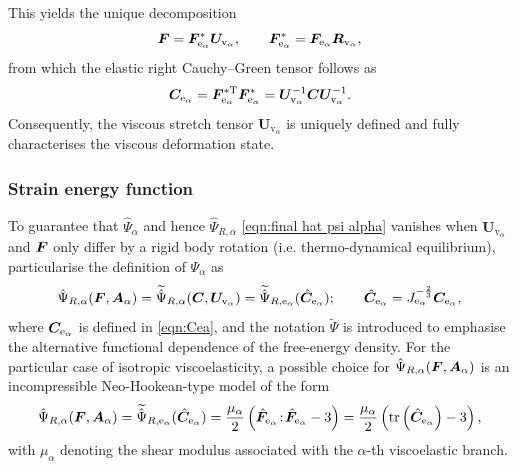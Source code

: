%
This yields the unique decomposition
%
\begin{equation}
	\label{eqb:Fv_rotation_free}
	\boldsymbol{F}
	=
	\boldsymbol{F}_{\mathrm{e}_\alpha}^{*}
	\boldsymbol{U}_{\mathrm{v}_\alpha},
	\qquad
	\boldsymbol{F}_{\mathrm{e}_\alpha}^{*}
	=
	\boldsymbol{F}_{\mathrm{e}_\alpha}
	\boldsymbol{R}_{\mathrm{v}_\alpha},
\end{equation}
%
from which the elastic right Cauchy--Green tensor follows as
%
\begin{equation}
	\label{eqn:Cea}
	\boldsymbol{C}_{\mathrm{e}_\alpha}
	=
	\boldsymbol{F}_{\mathrm{e}_\alpha}^{*\mathrm{T}}
	\boldsymbol{F}_{\mathrm{e}_\alpha}^{*}
	=
	\boldsymbol{U}_{\mathrm{v}_\alpha}^{-1}
	\boldsymbol{C}
	\boldsymbol{U}_{\mathrm{v}_\alpha}^{-1}.
\end{equation}
%
Consequently, the viscous stretch tensor $\boldsymbol{U}_{\mathrm{v}_\alpha}$ is uniquely defined and fully characterises the viscous deformation state.

\subsubsection{Strain energy function}
\label{sec:strain_energy_function}

To guarantee that $\hat{\Psi}_\alpha$ and hence $\hat{\Psi}_{R,\alpha}$ \eqref{eqn:final hat psi alpha}  vanishes when $\boldsymbol{U}_{\mathrm{v}_\alpha}$ and $\boldsymbol{F}$ only differ by a rigid body rotation (i.e. thermo-dynamical equilibrium), \cite{Liu2025} particularise the definition of $\Psi_\alpha$  as 
%
\begin{equation}
	\label{eqn:Psi_Cea}
	\hat{\Psi}_{R,\alpha}(\boldsymbol{F},\boldsymbol{A}_\alpha) =
	\widetilde{\hat{\Psi}}_{R,\alpha}(\boldsymbol{C},\boldsymbol{U}_{\mathrm{v}_{\alpha}}) =
	\widetilde{\hat{\Psi}}_{R,\mathrm{e}_{\alpha}}(\hat{\boldsymbol{C}}_{\mathrm{e}_\alpha});\qquad \hat{\boldsymbol{C}}_{\mathrm{e}_{\alpha}} = J_{\mathrm{e}_{\alpha}}^{-\frac{2}{3}}\boldsymbol{C}_{\mathrm{e}_{\alpha}},
\end{equation}
%
where $\boldsymbol{C}_{\mathrm{e}_\alpha}$ is defined in \eqref{eqn:Cea}, and the notation $\widetilde{\Psi}$ is introduced to emphasise the alternative functional dependence of the free-energy density. For the particular case of isotropic viscoelasticity, a possible choice for $\hat{\Psi}_{R,\alpha}(\boldsymbol{F},\boldsymbol{A}_\alpha)$ is an incompressible Neo-Hookean-type model of the form
%
\begin{equation}
	\label{eqn:isochoric_visco_neo_hokean}
	\hat\Psi_{R,\alpha}(\boldsymbol{F},\boldsymbol{A}_\alpha)
	=
	\widetilde{\hat{\Psi}}_{R,\mathrm{e}_{\alpha}}(\hat{\boldsymbol{C}}_{\mathrm{e}_\alpha})
	=
	\frac{\mu_\alpha}{2}
	\left(
	\hat{\boldsymbol{F}}_{\mathrm{e}_\alpha}\!:\!\hat{\boldsymbol{F}}_{\mathrm{e}_\alpha} - 3
	\right)=\frac{\mu_\alpha}{2}
	\left(
	\operatorname{tr}\left(\hat{\boldsymbol{C}}_{\mathrm{e}_\alpha}\right) - 3
	\right),
\end{equation}
%
with $\mu_\alpha$ denoting the shear modulus associated with the $\alpha$-th viscoelastic branch.

